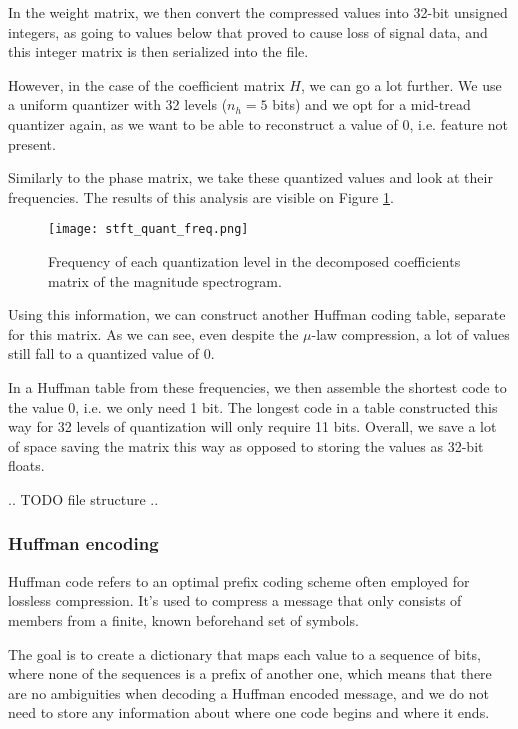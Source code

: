 In the weight matrix, we then convert the compressed values into 32-bit unsigned integers, as going to values below that proved to cause loss of signal data, and this integer matrix is then serialized into the file.

However, in the case of the coefficient matrix $H$, we can go a lot further. We use a uniform quantizer with 32 levels ($n_h = 5$ bits) and we opt for a mid-tread quantizer again, as we want to be able to reconstruct a value of $0$, i.e. feature not present.

Similarly to the phase matrix, we take these quantized values and look at their frequencies. The results of this analysis are visible on Figure \ref{fig:stft_quant_freq}.

\begin{figure}[ht]
	\caption[ANMF-STFT quantized magnitude coefficient frequencies]{Frequency of each quantization level in the decomposed coefficients matrix of the magnitude spectrogram.}
	\label{fig:stft_quant_freq}
	\centering
	\texttt{[image: stft\_quant\_freq.png]}
\end{figure}

Using this information, we can construct another Huffman coding table, separate for this matrix. As we can see, even despite the $\mu$-law compression, a lot of values still fall to a quantized value of $0$.

In a Huffman table from these frequencies, we then assemble the shortest code to the value $0$, i.e. we only need 1 bit. The longest code in a table constructed this way for 32 levels of quantization will only require 11 bits. Overall, we save a lot of space saving the matrix this way as opposed to storing the values as 32-bit floats.

.. TODO file structure ..

\subsubsection{Huffman encoding}
\label{sec:huffman}
Huffman code refers to an optimal prefix coding scheme often employed for lossless compression. It's used to compress a message that only consists of members from a finite, known beforehand set of symbols. \cite{huffman_1952}

The goal is to create a dictionary that maps each value to a sequence of bits, where none of the sequences is a prefix of another one, which means that there are no ambiguities when decoding a Huffman encoded message, and we do not need to store any information about where one code begins and where it ends.

